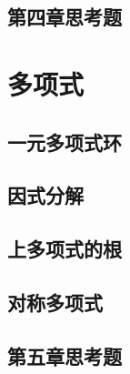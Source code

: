 \documentclass[zihao=-4,UTF8]{report}
\begin{document}
\section{第四章思考题}

\chapter{多项式}
\thispagestyle{fancy} 
\section{一元多项式环}
\section{因式分解}
\section{上多项式的根}
\section{对称多项式}
\section{第五章思考题}

\nocite{*}

\thispagestyle{fancy} 
\end{document}

